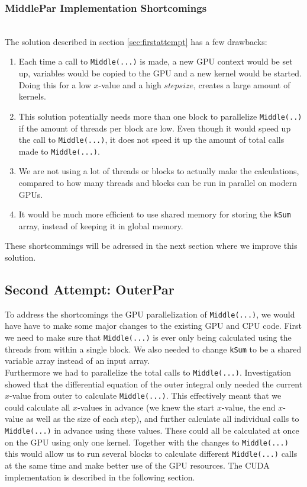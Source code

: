 \subsubsection{MiddlePar Implementation Shortcomings} \hfill \\
\label{label:shortages}
The solution described in section \ref{sec:firstattempt} has a few drawbacks:
\begin{enumerate}
	\item Each time a call to \texttt{Middle(...)} is made, a new GPU context would be set up, variables would be copied to the GPU and a new kernel would be started. Doing this for a low $x$-value and a high $stepsize$, creates a large amount of kernels.
	\item This solution potentially needs more than one block to parallelize \texttt{Middle(..)} if the amount of threads per block are low. Even though it would speed up the call to \texttt{Middle(...)}, it does not speed it up the amount of total calls made to \texttt{Middle(...)}.
	\item We are not using a lot of threads or blocks to actually make the calculations, compared to how many threads and blocks can be run in parallel on modern GPUs.
	\item It would be much more efficient to use shared memory for storing the \texttt{kSum} array, instead of keeping it in global memory.
\end{enumerate}

These shortcommings will be adressed in the next section where we improve this solution.\\

\subsection{Second Attempt: OuterPar}
To address the shortcomings the GPU parallelization of \texttt{Middle(...)}, we would have have to make some major changes to the existing GPU and CPU code. First we need to make sure that \texttt{Middle(...)} is ever only being calculated using the threads from within a single block. We also needed to change \texttt{kSum} to be a shared variable array instead of an input array. \\

Furthermore we had to parallelize the total calls to \texttt{Middle(...)}. Investigation showed that the differential equation of the outer integral only needed the current $x$-value from outer to calculate \texttt{Middle(...)}. This effectively meant that we could calculate all $x$-values in advance (we knew the start $x$-value, the end $x$-value as well as the size of each step), and further calculate all individual calls to \texttt{Middle(...)} in advance using these values. These could all be calculated at once on the GPU using only one kernel. Together with the changes to \texttt{Middle(...)} this would allow us to run several blocks to calculate different \texttt{Middle(...)} calls at the same time and make better use of the GPU resources. The CUDA implementation is described in the following section.

